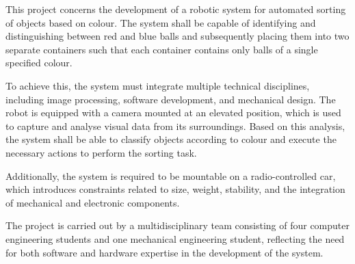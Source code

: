This project concerns the development of a robotic system for automated
sorting of objects based on colour. The system shall be capable of
identifying and distinguishing between red and blue balls and subsequently
placing them into two separate containers such that each container contains
only balls of a single specified colour.

To achieve this, the system must integrate multiple technical disciplines, including image processing, software development, and mechanical design. The robot is equipped with a camera mounted at an elevated position, which is used to capture and analyse visual data from its surroundings. Based on this analysis, the system shall be able to classify objects according to colour and execute the necessary actions to perform the sorting task.

Additionally, the system is required to be mountable on a radio-controlled car, which introduces constraints related to size, weight, stability, and the integration of mechanical and electronic components.

The project is carried out by a multidisciplinary team consisting of four computer engineering students and one mechanical engineering student, reflecting the need for both software and hardware expertise in the development of the system.
